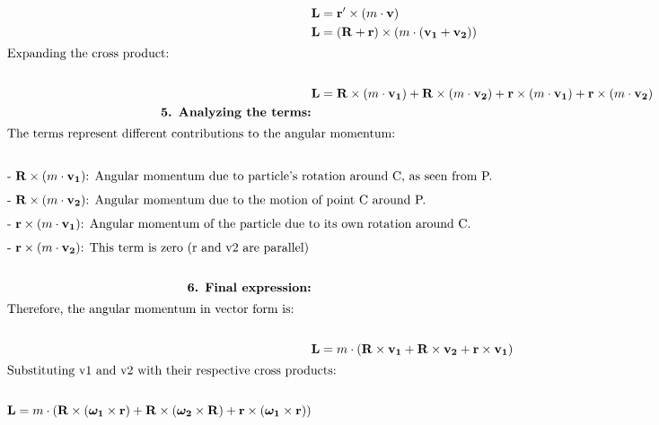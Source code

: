 \begin{solution}
\begin{align*}
    &\mathbf{L} = \mathbf{r'} \times (m \cdot \mathbf{v}) \\
    &\mathbf{L} = (\mathbf{R} + \mathbf{r}) \times (m \cdot (\mathbf{v_1} + \mathbf{v_2})) \\
    \intertext{Expanding the cross product:}\\
    &\mathbf{L} = \mathbf{R} \times (m \cdot \mathbf{v_1}) + \mathbf{R} \times (m \cdot \mathbf{v_2}) + \mathbf{r} \times (m \cdot \mathbf{v_1}) + \mathbf{r} \times (m \cdot \mathbf{v_2}) \\ 
    \textbf{5. Analyzing the terms:} \\
    \intertext{The terms represent different contributions to the angular momentum:} \\
    \intertext{- $\mathbf{R} \times (m \cdot \mathbf{v_1})$: Angular momentum due to particle's rotation around C, as seen from P.}
    \intertext{- $\mathbf{R} \times (m \cdot \mathbf{v_2})$: Angular momentum due to the motion of point C around P.}
    \intertext{- $\mathbf{r} \times (m \cdot \mathbf{v_1})$: Angular momentum of the particle due to its own rotation around C.}
    \intertext{- $\mathbf{r} \times (m \cdot \mathbf{v_2})$: This term is zero (r and v2 are parallel)}\\
    \textbf{6. Final expression:} \\
    \intertext{Therefore, the angular momentum in vector form is:} \\
    &\mathbf{L} = m \cdot (\mathbf{R} \times \mathbf{v_1} + \mathbf{R} \times \mathbf{v_2} + \mathbf{r} \times \mathbf{v_1}) \\
    \intertext{Substituting v1 and v2 with their respective cross products:} \\
    \mathbf{L} = m \cdot (\mathbf{R} \times (\boldsymbol{\omega_1} \times \mathbf{r}) + \mathbf{R} \times (\boldsymbol{\omega_2} \times \mathbf{R}) + \mathbf{r} \times (\boldsymbol{\omega_1} \times \mathbf{r}))
    \end{align*}
\end{solution}

